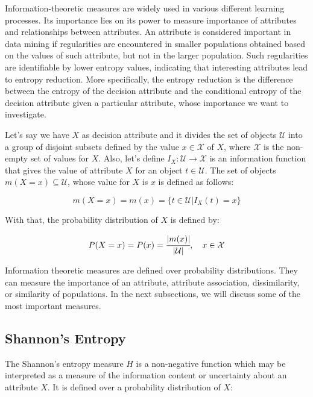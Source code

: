 Information-theoretic measures are widely used in various different learning processes. Its importance lies on its
power
to measure importance of attributes and relationships between attributes. An attribute is considered important in data
mining if regularities are encountered in smaller populations obtained based on the values of such attribute, but not
in
the larger population. Such regularities are identifiable by lower entropy values, indicating that interesting
attributes lead to entropy reduction. More specifically, the entropy reduction is the difference between the entropy
of
the decision attribute and the conditional entropy of the decision attribute given a particular attribute, whose
importance we want to investigate.

Let's say we have $X$ as decision attribute and it divides the set of objects $\mathcal{U}$ into a group of disjoint
subsets defined by the value $x \in \mathcal{X}$ of $X$, where $\mathcal{X}$ is the non-empty set of values for
$X$. Also, let's define $I_X : \mathcal{U} \rightarrow \mathcal{X}$ is an information function that gives the value of
attribute $X$ for an object $t \in \mathcal{U}$. The set of objects $m(X=x) \subseteq \mathcal{U}$, whose value for
$X$
is $x$ is defined as follows:

\begin{equation}
 m(X=x)=m(x)=\{t \in \mathcal{U} | I_X(t)=x\}
\end{equation}

With that, the probability distribution of $X$ is defined by:

\begin{equation}
 P(X=x)=P(x)=\cfrac{|m(x)|}{|\mathcal{U}|},\quad x \in \mathcal{X}
\end{equation}

Information theoretic measures are defined over probability distributions. They can measure the importance of an
attribute, attribute association, dissimilarity, or similarity of populations. In the next subsections, we will
discuss some of the most important measures.

\subsection{Shannon's Entropy}

The Shannon's entropy measure $H$ is a non-negative function which may be interpreted as a measure of the information
content or uncertainty about an attribute $X$. It is defined over a probability distribution of $X$:

